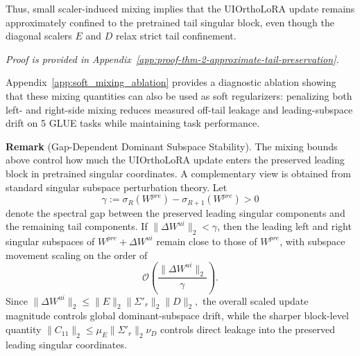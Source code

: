 Thus, small scaler-induced mixing implies that the UIOrthoLoRA update remains
approximately confined to the pretrained tail singular block, even though the
diagonal scalers $E$ and $D$ relax strict tail confinement.

\textit{Proof is provided in Appendix~\ref{app:proof-thm-2-approximate-tail-preservation}.}

Appendix~\ref{app:soft_mixing_ablation} provides a diagnostic ablation showing
that these mixing quantities can also be used as soft regularizers: penalizing
both left- and right-side mixing reduces measured off-tail leakage and
leading-subspace drift on 5 GLUE tasks while maintaining task performance.


\noindent \textbf{Remark} (Gap-Dependent Dominant Subspace Stability).
The mixing bounds above control how much the UIOrthoLoRA update enters the
preserved leading block in pretrained singular coordinates. A complementary
view is obtained from standard singular subspace perturbation theory. Let
\[
\gamma := \sigma_R(W^{pre}) - \sigma_{R+1}(W^{pre}) > 0
\]
denote the spectral gap between the preserved leading singular components and
the remaining tail components. If $\|\Delta W^{ui}\|_2 < \gamma$, then the leading left and right singular subspaces of $W^{pre}+\Delta W^{ui}$
remain close to those of \(W^{pre}\), with subspace movement scaling on the
order of
\[
\mathcal{O}\left(\frac{\|\Delta W^{ui}\|_2}{\gamma}\right).
\]
Since $\|\Delta W^{ui}\|_2
\leq
\|E\|_2\|\Sigma'_r\|_2\|D\|_2,
$
the overall scaled update magnitude controls global dominant-subspace drift,
while the sharper block-level quantity $\|C_{11}\|_2
\leq
\mu_E\|\Sigma'_r\|_2\nu_D
$
controls direct leakage into the preserved leading singular coordinates.

